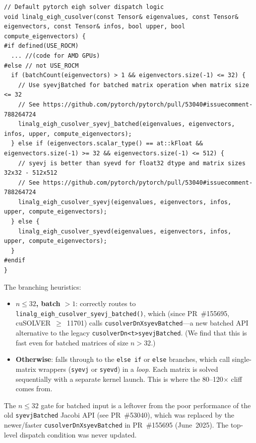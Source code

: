 \documentclass[10pt, letterpaper]{article}
\begin{document}
\begin{lstlisting}
// Default pytorch eigh solver dispatch logic
void linalg_eigh_cusolver(const Tensor& eigenvalues, const Tensor& eigenvectors, const Tensor& infos, bool upper, bool compute_eigenvectors) {
#if defined(USE_ROCM)
  ... //(code for AMD GPUs)
#else // not USE_ROCM
  if (batchCount(eigenvectors) > 1 && eigenvectors.size(-1) <= 32) {
    // Use syevjBatched for batched matrix operation when matrix size <= 32
    // See https://github.com/pytorch/pytorch/pull/53040#issuecomment-788264724
    linalg_eigh_cusolver_syevj_batched(eigenvalues, eigenvectors, infos, upper, compute_eigenvectors);
  } else if (eigenvectors.scalar_type() == at::kFloat && eigenvectors.size(-1) >= 32 && eigenvectors.size(-1) <= 512) {
    // syevj is better than syevd for float32 dtype and matrix sizes 32x32 - 512x512
    // See https://github.com/pytorch/pytorch/pull/53040#issuecomment-788264724
    linalg_eigh_cusolver_syevj(eigenvalues, eigenvectors, infos, upper, compute_eigenvectors);
  } else {
    linalg_eigh_cusolver_syevd(eigenvalues, eigenvectors, infos, upper, compute_eigenvectors);
  }
#endif
}
\end{lstlisting}

The branching heuristics:
\begin{itemize}
    \item \textbf{$n \le 32$, batch $> 1$}: correctly routes to
    \texttt{linalg\_eigh\_cusolver\_syevj\_batched()}, which (since
    PR~\#155695, cuSOLVER~$\ge$~11701) calls
    \texttt{cusolverDnXsyevBatched}---a new batched API alternative to the legacy \texttt{cusolverDn<t>syevjBatched}. (We find that this is fast even for batched matrices of size $n>32$.)

    \item \textbf{Otherwise}: falls through to the
    \texttt{else~if} or \texttt{else} branches, which call single-matrix
    wrappers (\texttt{syevj} or \texttt{syevd}) in a \emph{loop}. Each
    matrix is solved sequentially with a separate kernel launch. This is
    where the 80--120$\times$ cliff comes from.
\end{itemize}

The $n \le 32$ gate for batched input is a leftover from the poor performance of the old \texttt{syevjBatched}
Jacobi API (see PR~\#53040), which was replaced by the newer/faster 
\texttt{cusolverDnXsyevBatched} in PR~\#155695 (June~2025). The
top-level dispatch condition was never updated.

\newpage
\end{document}
